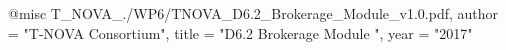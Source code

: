 @misc{ T_NOVA_./WP6/TNOVA_D6.2_Brokerage_Module_v1.0.pdf,
       author = "{T-NOVA Consortium}",
       title = "D6.2 Brokerage Module ",
       year = "2017" }
